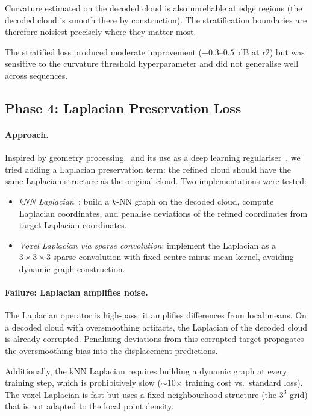 Curvature estimated on the decoded cloud is also unreliable at edge regions
(the decoded cloud is smooth there by construction).
The stratification boundaries are therefore noisiest precisely where they matter
most.

The stratified loss produced moderate improvement ($+0.3$--$0.5$~dB at r2)
but was sensitive to the curvature threshold hyperparameter and did not
generalise well across sequences.

\subsection{Phase 4: Laplacian Preservation Loss}

\paragraph{Approach.}
Inspired by geometry processing~\cite{sorkine2004laplacian} and its use
as a deep learning regulariser~\cite{wang2018pixel2mesh}, we tried adding a
Laplacian preservation term: the refined cloud should have the same Laplacian
structure as the original cloud.
Two implementations were tested:
\begin{itemize}
  \item \textit{kNN Laplacian}~\cite{taubin1995signal}: build a $k$-NN graph
    on the decoded cloud, compute Laplacian coordinates, and penalise
    deviations of the refined coordinates from target Laplacian coordinates.
  \item \textit{Voxel Laplacian via sparse convolution}: implement the
    Laplacian as a $3 \times 3 \times 3$ sparse convolution with fixed
    centre-minus-mean kernel, avoiding dynamic graph construction.
\end{itemize}

\paragraph{Failure: Laplacian amplifies noise.}
The Laplacian operator is high-pass: it amplifies differences from local means.
On a decoded cloud with oversmoothing artifacts, the Laplacian of the decoded
cloud is already corrupted.
Penalising deviations from this corrupted target propagates the oversmoothing
bias into the displacement predictions.

Additionally, the kNN Laplacian requires building a dynamic graph at every
training step, which is prohibitively slow ($\sim$10$\times$ training cost
vs.\ standard loss).
The voxel Laplacian is fast but uses a fixed neighbourhood structure (the
$3^3$ grid) that is not adapted to the local point density.

